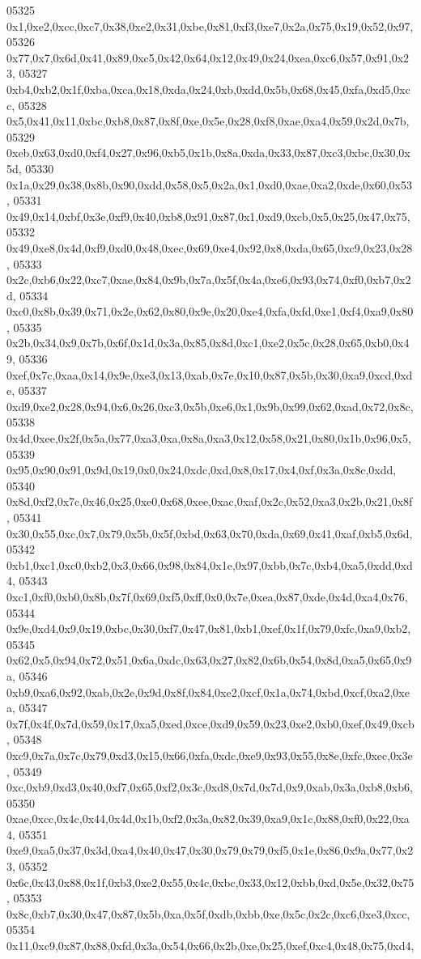 \begin{DoxyCode}
05325   0x1,0xe2,0xcc,0xc7,0x38,0xe2,0x31,0xbe,0x81,0xf3,0xe7,0x2a,0x75,0x19,0x52,0x97,
05326   0x77,0x7,0x6d,0x41,0x89,0xc5,0x42,0x64,0x12,0x49,0x24,0xea,0xc6,0x57,0x91,0x23,
05327   0xb4,0xb2,0x1f,0xba,0xca,0x18,0xda,0x24,0xb,0xdd,0x5b,0x68,0x45,0xfa,0xd5,0xcc,
05328   0x5,0x41,0x11,0xbc,0xb8,0x87,0x8f,0xe,0x5e,0x28,0xf8,0xae,0xa4,0x59,0x2d,0x7b,
05329   0xeb,0x63,0xd0,0xf4,0x27,0x96,0xb5,0x1b,0x8a,0xda,0x33,0x87,0xc3,0xbc,0x30,0x5d,
05330   0x1a,0x29,0x38,0x8b,0x90,0xdd,0x58,0x5,0x2a,0x1,0xd0,0xae,0xa2,0xde,0x60,0x53,
05331   0x49,0x14,0xbf,0x3e,0xf9,0x40,0xb8,0x91,0x87,0x1,0xd9,0xcb,0x5,0x25,0x47,0x75,
05332   0x49,0xe8,0x4d,0xf9,0xd0,0x48,0xec,0x69,0xe4,0x92,0x8,0xda,0x65,0xc9,0x23,0x28,
05333   0x2c,0xb6,0x22,0xc7,0xae,0x84,0x9b,0x7a,0x5f,0x4a,0xe6,0x93,0x74,0xf0,0xb7,0x2d,
05334   0xc0,0x8b,0x39,0x71,0x2e,0x62,0x80,0x9e,0x20,0xe4,0xfa,0xfd,0xe1,0xf4,0xa9,0x80,
05335   0x2b,0x34,0x9,0x7b,0x6f,0x1d,0x3a,0x85,0x8d,0xc1,0xe2,0x5c,0x28,0x65,0xb0,0x49,
05336   0xef,0x7c,0xaa,0x14,0x9e,0xe3,0x13,0xab,0x7e,0x10,0x87,0x5b,0x30,0xa9,0xcd,0xde,
05337   0xd9,0xe2,0x28,0x94,0x6,0x26,0xc3,0x5b,0xe6,0x1,0x9b,0x99,0x62,0xad,0x72,0x8c,
05338   0x4d,0xee,0x2f,0x5a,0x77,0xa3,0xa,0x8a,0xa3,0x12,0x58,0x21,0x80,0x1b,0x96,0x5,
05339   0x95,0x90,0x91,0x9d,0x19,0x0,0x24,0xdc,0xd,0x8,0x17,0x4,0xf,0x3a,0x8c,0xdd,
05340   0x8d,0xf2,0x7c,0x46,0x25,0xe0,0x68,0xee,0xac,0xaf,0x2c,0x52,0xa3,0x2b,0x21,0x8f,
05341   0x30,0x55,0xc,0x7,0x79,0x5b,0x5f,0xbd,0x63,0x70,0xda,0x69,0x41,0xaf,0xb5,0x6d,
05342   0xb1,0xc1,0xc0,0xb2,0x3,0x66,0x98,0x84,0x1e,0x97,0xbb,0x7c,0xb4,0xa5,0xdd,0xd4,
05343   0xc1,0xf0,0xb0,0x8b,0x7f,0x69,0xf5,0xff,0x0,0x7e,0xea,0x87,0xde,0x4d,0xa4,0x76,
05344   0x9e,0xd4,0x9,0x19,0xbc,0x30,0xf7,0x47,0x81,0xb1,0xef,0x1f,0x79,0xfc,0xa9,0xb2,
05345   0x62,0x5,0x94,0x72,0x51,0x6a,0xdc,0x63,0x27,0x82,0x6b,0x54,0x8d,0xa5,0x65,0x9a,
05346   0xb9,0xa6,0x92,0xab,0x2e,0x9d,0x8f,0x84,0xe2,0xcf,0x1a,0x74,0xbd,0xcf,0xa2,0xea,
05347   0x7f,0x4f,0x7d,0x59,0x17,0xa5,0xed,0xce,0xd9,0x59,0x23,0xe2,0xb0,0xef,0x49,0xcb,
05348   0xc9,0x7a,0x7c,0x79,0xd3,0x15,0x66,0xfa,0xdc,0xe9,0x93,0x55,0x8e,0xfc,0xec,0x3e,
05349   0xc,0xb9,0xd3,0x40,0xf7,0x65,0xf2,0x3c,0xd8,0x7d,0x7d,0x9,0xab,0x3a,0xb8,0xb6,
05350   0xae,0xcc,0x4c,0x44,0x4d,0x1b,0xf2,0x3a,0x82,0x39,0xa9,0x1c,0x88,0xf0,0x22,0xa4,
05351   0xe9,0xa5,0x37,0x3d,0xa4,0x40,0x47,0x30,0x79,0x79,0xf5,0x1e,0x86,0x9a,0x77,0x23,
05352   0x6c,0x43,0x88,0x1f,0xb3,0xe2,0x55,0x4c,0xbc,0x33,0x12,0xbb,0xd,0x5e,0x32,0x75,
05353   0x8c,0xb7,0x30,0x47,0x87,0x5b,0xa,0x5f,0xdb,0xbb,0xe,0x5c,0x2c,0xc6,0xe3,0xcc,
05354   0x11,0xc9,0x87,0x88,0xfd,0x3a,0x54,0x66,0x2b,0xe,0x25,0xef,0xc4,0x48,0x75,0xd4,

\end{DoxyCode}
